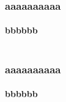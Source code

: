 \documentclass{beamer}
\begin{document}
\frame
{
  \frametitle{aaaaaaaaaa}
  \framesubtitle{bbbbbb}

\begin{columns}
	\begin{column}{6cm}
	
	\end{column}
\pause
	\begin{column}{6cm}
	
	\end{column}
\end{columns}

}
\frame
{
  \frametitle{aaaaaaaaaa}
  \framesubtitle{bbbbbb}

\begin{columns}
	\begin{column}{6cm}
	
	\end{column}
\pause
	\begin{column}{6cm}
	
	\end{column}
\end{columns}

}
\end{document}
